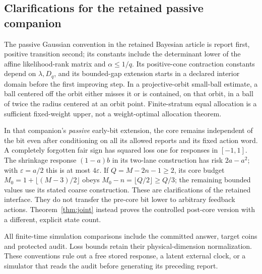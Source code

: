\subsection{Clarifications for the retained passive companion}
The passive Gaussian convention in the retained Bayesian article is report first, positive transition second; its constants include the determinant lower of the affine likelihood-rank matrix and $\alpha\le1/q$. Its positive-cone contraction constants depend on $\lambda,D_q$, and its bounded-gap extension starts in a declared interior domain before the first improving step. In a projective-orbit small-ball estimate, a ball centered off the orbit either misses it or is contained, on that orbit, in a ball of twice the radius centered at an orbit point. Finite-stratum equal allocation is a sufficient fixed-weight upper, not a weight-optimal allocation theorem.

In that companion's \emph{passive} early-bit extension, the core remains independent of the bit even after conditioning on all its allowed reports and its fixed action word. A completely forgotten fair sign has squared loss one for responses in $[-1,1]$. The shrinkage response $(1-a)b$ in its two-lane construction has risk $2a-a^2$; with $\varepsilon=a/2$ this is at most $4\varepsilon$. If $Q=M-2n-1\ge2$, its core budget $M_0=1+\lfloor(M-3)/2\rfloor$ obeys
$M_0-n=\lfloor Q/2\rfloor\ge Q/3$; the remaining bounded values use its stated coarse construction. These are clarifications of the retained interface. They do not transfer the pre-core bit lower to arbitrary feedback actions. Theorem~\ref{thm:joint} instead proves the controlled post-core version with a different, explicit state count.

All finite-time simulation comparisons include the committed answer, target coins and protected audit. Loss bounds retain their physical-dimension normalization. These conventions rule out a free stored response, a latent external clock, or a simulator that reads the audit before generating its preceding report.
